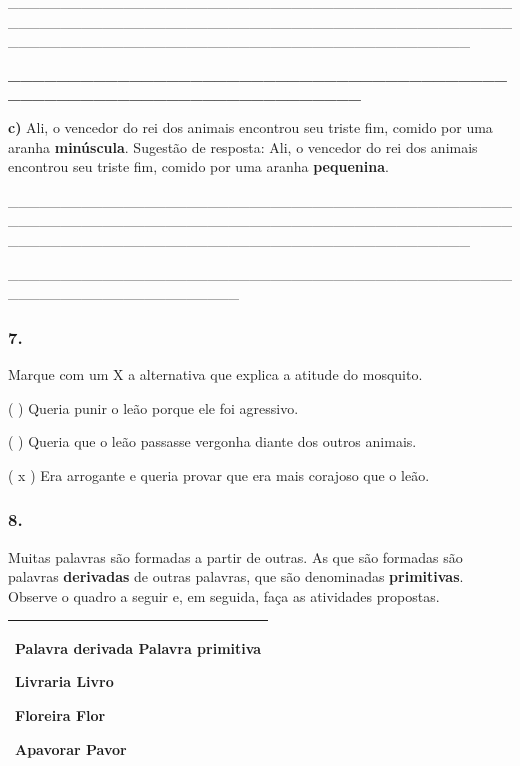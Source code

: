 \_\_\_\_\_\_\_\_\_\_\_\_\_\_\_\_\_\_\_\_\_\_\_\_\_\_\_\_\_\_\_\_\_\_\_\_\_\_\_\_\_\_\_\_\_\_\_\_\_\_\_\_\_\_\_\_\_\_\_\_\_\_\_\_\_\_\_\_\_\_\_\_\_\_\_\_\_\_\_\_\_\_\_\_\_\_\_\_\_\_\_\_\_\_\_\_\_\_\_\_\_\_\_\_\_\_\_\_\_\_\_\_\_\_\_\_\_\_\_\_\_\_\_\_\_\_\_\_\_\_\_\_\_\_\_\_\_\_\_\_

\textbf{\_\_\_\_\_\_\_\_\_\_\_\_\_\_\_\_\_\_\_\_\_\_\_\_\_\_\_\_\_\_\_\_\_\_\_\_\_\_\_\_\_\_\_\_\_\_\_\_\_\_\_\_\_\_\_\_\_\_\_\_\_\_\_\_\_\_\_\_\_\_}

\textbf{c)} Ali, o vencedor do rei dos animais encontrou seu triste fim,
comido por uma aranha \textbf{minúscula}. Sugestão de resposta: Ali, o
vencedor do rei dos animais encontrou seu triste fim, comido por uma
aranha \textbf{pequenina}.

\_\_\_\_\_\_\_\_\_\_\_\_\_\_\_\_\_\_\_\_\_\_\_\_\_\_\_\_\_\_\_\_\_\_\_\_\_\_\_\_\_\_\_\_\_\_\_\_\_\_\_\_\_\_\_\_\_\_\_\_\_\_\_\_\_\_\_\_\_\_\_\_\_\_\_\_\_\_\_\_\_\_\_\_\_\_\_\_\_\_\_\_\_\_\_\_\_\_\_\_\_\_\_\_\_\_\_\_\_\_\_\_\_\_\_\_\_\_\_\_\_\_\_\_\_\_\_\_\_\_\_\_\_\_\_\_\_\_\_\_

\_\_\_\_\_\_\_\_\_\_\_\_\_\_\_\_\_\_\_\_\_\_\_\_\_\_\_\_\_\_\_\_\_\_\_\_\_\_\_\_\_\_\_\_\_\_\_\_\_\_\_\_\_\_\_\_\_\_\_\_\_\_\_\_\_\_\_\_\_\_

\subsubsection{7. }\label{section-6}

Marque com um X a alternativa que explica a atitude do mosquito.

( ) Queria punir o leão porque ele foi agressivo.

( ) Queria que o leão passasse vergonha diante dos outros animais.

( x ) Era arrogante e queria provar que era mais corajoso que o leão.

\subsubsection{8. }\label{section-7}

Muitas palavras são formadas a partir de outras. As que são formadas são
palavras \textbf{derivadas} de outras palavras, que são denominadas
\textbf{primitivas}. Observe o quadro a seguir e, em seguida, faça as
atividades propostas.

\begin{longtable}[]{@{}l@{}}
\toprule
\begin{minipage}[t]{0.97\columnwidth}\raggedright\strut
\textbf{Palavra derivada Palavra primitiva}

Livraria Livro

Floreira Flor

Apavorar Pavor\strut
\end{minipage}\tabularnewline
\bottomrule
\end{longtable}

